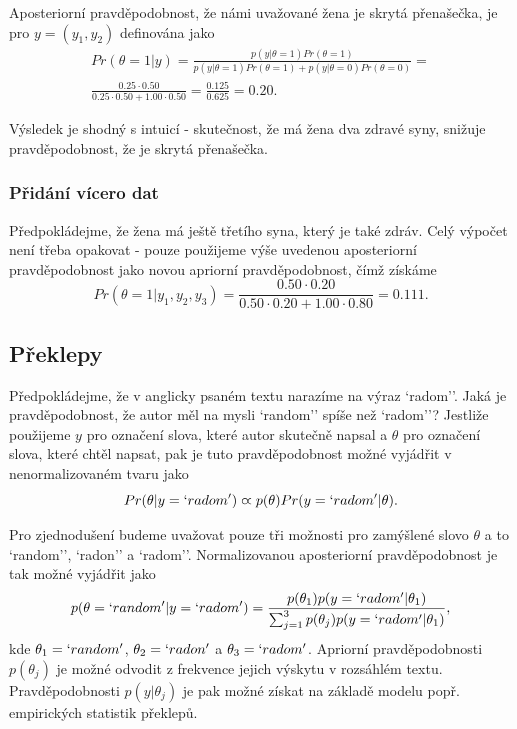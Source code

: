 Aposteriorní pravděpodobnost, že námi uvažované žena je skrytá přenašečka, je pro $y = (y_1, y_2)$ definována jako
\begin{multline*}
Pr(\theta = 1 | y) = \frac{p(y | \theta = 1)Pr(\theta = 1)}{p(y | \theta = 1) Pr(\theta = 1) + p(y | \theta = 0)Pr(\theta = 0)} =\\
\frac{0.25 \cdot 0.50}{0.25 \cdot 0.50 + 1.00 \cdot 0.50} = \frac{0.125}{0.625} = 0.20.
\end{multline*}

Výsledek je shodný s intuicí - skutečnost, že má žena dva zdravé syny, snižuje pravděpodobnost, že je skrytá přenašečka.

\subsubsection{Přidání vícero dat}

Předpokládejme, že žena má ještě třetího syna, který je také zdráv. Celý výpočet není třeba opakovat - pouze použijeme výše uvedenou aposteriorní pravděpodobnost jako novou apriorní pravděpodobnost, čímž získáme
\begin{equation*}
Pr(\theta = 1 | y_1, y_2, y_3) = \frac{0.50 \cdot 0.20}{0.50 \cdot 0.20 + 1.00 \cdot 0.80} = 0.111.
\end{equation*}

\subsection{Překlepy}

Předpokládejme, že v anglicky psaném textu narazíme na výraz `radom''. Jaká je pravděpodobnost, že autor měl na mysli `random'' spíše než `radom''? Jestliže použijeme $y$ pro označení slova, které autor skutečně napsal a $\theta$ pro označení slova, které chtěl napsat, pak je tuto pravděpodobnost možné vyjádřit v nenormalizovaném tvaru jako
\begin{equation}
Pr(\theta | y = `radom') \varpropto p(\theta) Pr(y = `radom' | \theta).
\end{equation}

Pro zjednodušení budeme uvažovat pouze tři možnosti pro zamýšlené slovo $\theta$ a to `random'', `radon'' a `radom''. Normalizovanou aposteriorní pravděpodobnost je tak možné vyjádřit jako
\begin{equation*}
p(\theta = `random' | y = `radom') = \frac{p(\theta_1)p(y = `radom' | \theta_1)}{\sum_{j = 1}^3 p(\theta_j)p(y = `radom' | \theta_1)},
\end{equation*}
kde $\theta_1 = `random'$, $\theta_2 = `radon'$ a $\theta_3 = `radom'$. Apriorní pravděpodobnosti $p(\theta_j)$ je možné odvodit z frekvence jejich výskytu v rozsáhlém textu. Pravděpodobnosti $p(y|\theta_j)$ je pak možné získat na základě modelu popř. empirických statistik překlepů.

